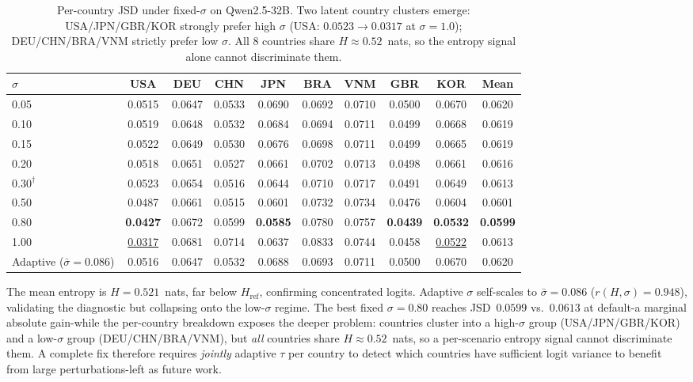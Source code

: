 \documentclass{article}
\begin{document}
\begin{table}[h]\centering\scriptsize
\caption{Per-country JSD under fixed-$\sigma$ on Qwen2.5-32B. Two latent country
clusters emerge: USA/JPN/GBR/KOR strongly prefer high $\sigma$ (USA: $0.0523\to0.0317$
at $\sigma{=}1.0$); DEU/CHN/BRA/VNM strictly prefer low $\sigma$. All 8 countries
share $H\approx0.52$~nats, so the entropy signal alone cannot discriminate them.}
\label{tab:sigma_percountry}
\begin{tabular}{lcccccccc|c}\toprule
$\sigma$ & USA & DEU & CHN & JPN & BRA & VNM & GBR & KOR & Mean \\\midrule
0.05 & 0.0515 & 0.0647 & 0.0533 & 0.0690 & 0.0692 & 0.0710 & 0.0500 & 0.0670 & 0.0620 \\
0.10 & 0.0519 & 0.0648 & 0.0532 & 0.0684 & 0.0694 & 0.0711 & 0.0499 & 0.0668 & 0.0619 \\
0.15 & 0.0522 & 0.0649 & 0.0530 & 0.0676 & 0.0698 & 0.0711 & 0.0499 & 0.0665 & 0.0619 \\
0.20 & 0.0518 & 0.0651 & 0.0527 & 0.0661 & 0.0702 & 0.0713 & 0.0498 & 0.0661 & 0.0616 \\
$0.30^\dagger$ & 0.0523 & 0.0654 & 0.0516 & 0.0644 & 0.0710 & 0.0717 & 0.0491 & 0.0649 & 0.0613 \\
0.50 & 0.0487 & 0.0661 & 0.0515 & 0.0601 & 0.0732 & 0.0734 & 0.0476 & 0.0604 & 0.0601 \\
0.80 & \textbf{0.0427} & 0.0672 & 0.0599 & \textbf{0.0585} & 0.0780 & 0.0757 & \textbf{0.0439} & \textbf{0.0532} & \textbf{0.0599} \\
1.00 & \underline{0.0317} & 0.0681 & 0.0714 & 0.0637 & 0.0833 & 0.0744 & 0.0458 & \underline{0.0522} & 0.0613 \\\midrule
Adaptive ($\bar\sigma{=}0.086$) & 0.0516 & 0.0647 & 0.0532 & 0.0688 & 0.0693 & 0.0711 & 0.0500 & 0.0670 & 0.0620 \\\bottomrule
\end{tabular}
\end{table}

The mean entropy is $H=0.521$~nats, far below $H_\text{ref}$, confirming
concentrated logits. Adaptive $\sigma$ self-scales to $\bar\sigma=0.086$
($r(H,\sigma){=}0.948$), validating the diagnostic but collapsing onto the
low-$\sigma$ regime. The best fixed $\sigma{=}0.80$ reaches JSD~$0.0599$ vs.\
$0.0613$ at default-a marginal absolute gain-while the per-country breakdown
exposes the deeper problem: countries cluster into a high-$\sigma$ group
(USA/JPN/GBR/KOR) and a low-$\sigma$ group (DEU/CHN/BRA/VNM), but \emph{all}
countries share $H\approx0.52$~nats, so a per-scenario entropy signal cannot
discriminate them. A complete fix therefore requires \emph{jointly} adaptive
$\tau$ per country to detect which countries have sufficient logit variance to
benefit from large perturbations-left as future work.
\end{document}
